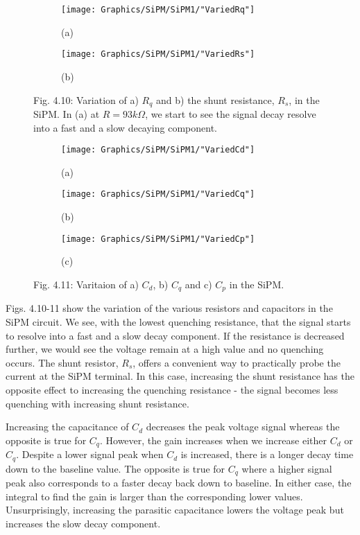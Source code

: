 \begin{figure}[h]
  \centering
  \begin{subfigure}
    \centering
    \texttt{[image: Graphics/SiPM/SiPM1/"VariedRq"]}
    \caption*{(a)}
  \end{subfigure}
  \begin{subfigure}
    \centering
    \texttt{[image: Graphics/SiPM/SiPM1/"VariedRs"]}
    \caption*{(b)}
  \end{subfigure}
  {\caption*{Fig. 4.10: Variation of a) $R_q$ and b) the shunt resistance, $R_s$, in the SiPM. In (a) at $R=93k\Omega$, we start to see the signal decay resolve into a fast and a slow decaying component.}}
\end{figure}

\begin{figure}[h]
  \centering
  \begin{subfigure}
    \centering
    \texttt{[image: Graphics/SiPM/SiPM1/"VariedCd"]}
    \caption*{(a)}
  \end{subfigure}
  \begin{subfigure}
    \centering
    \texttt{[image: Graphics/SiPM/SiPM1/"VariedCq"]}
    \caption*{(b)}
  \end{subfigure}
  \begin{subfigure}
    \centering
    \texttt{[image: Graphics/SiPM/SiPM1/"VariedCp"]}
    \caption*{(c)}
  \end{subfigure}
  {\caption*{Fig. 4.11: Varitaion of a) $C_d$, b) $C_q$ and c) $C_p$ in the SiPM.}}
\end{figure}

Figs. 4.10-11 show the variation of the various resistors and capacitors in the SiPM circuit. We see, with the lowest quenching resistance, that the signal starts to resolve into a fast and a slow decay component. If the resistance is decreased further, we would see the voltage remain at a high value and no quenching occurs. The shunt resistor, $R_s$, offers a convenient way to practically probe the current at the SiPM terminal. In this case, increasing the shunt resistance has the opposite effect to increasing the quenching resistance - the signal becomes less quenching with increasing shunt resistance.

Increasing the capacitance of $C_d$ decreases the peak voltage signal whereas the opposite is true for $C_q$. However, the gain increases when we increase either $C_d$ or $C_q$. Despite a lower signal peak when $C_d$ is increased, there is a longer decay time down to the baseline value. The opposite is true for $C_q$ where a higher signal peak also corresponds to a faster decay back down to baseline. In either case, the integral to find the gain is larger than the corresponding lower values. Unsurprisingly, increasing the parasitic capacitance lowers the voltage peak but increases the slow decay component.


